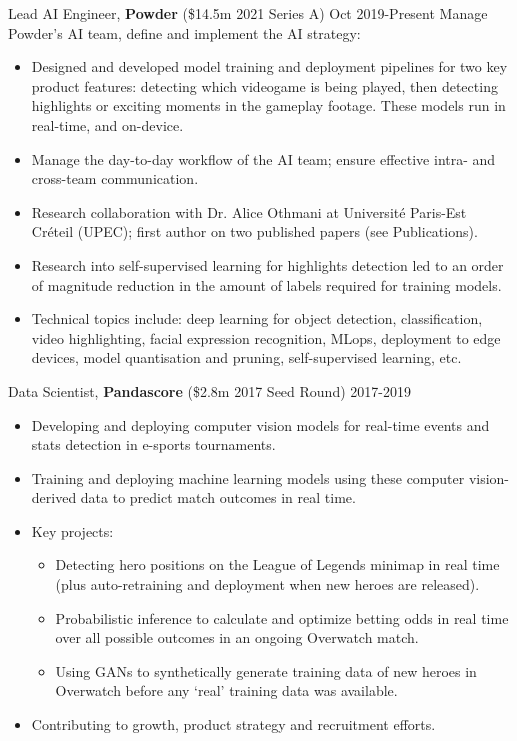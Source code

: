 \documentclass[margin]{res}
\begin{document}
\begin{resume}
		{Lead AI Engineer,} {\bf Powder} (\$14.5m 2021 Series A) \hfill Oct 2019-Present\vspace{2mm}\newline
		Manage Powder's AI team, define and implement the AI strategy:
		\vspace{1mm}
		\begin{itemize}
			\item Designed and developed model training and deployment pipelines for two key product features: detecting which videogame is being played, then detecting highlights or exciting moments in the gameplay footage. These models run in real-time, and on-device.
			\item Manage the day-to-day workflow of the AI team; ensure effective intra- and cross-team communication.
			\item Research collaboration with Dr.  Alice Othmani at Universit\'e Paris-Est Cr\'eteil (UPEC); first author on two published papers (see Publications).
			\item Research into self-supervised learning for highlights detection led to an order of magnitude reduction in the amount of labels required for training models.
			\item Technical topics include: deep learning for object detection, classification, video highlighting, facial expression recognition, MLops, deployment to edge devices, model quantisation and pruning, self-supervised learning, etc.
		\end{itemize}
		
		{Data Scientist,} {\bf Pandascore} (\$2.8m 2017 Seed Round) \hfill 2017-2019
		\vspace{1mm}
		\begin{itemize}
			\item Developing and deploying computer vision models for real-time events and stats detection in e-sports tournaments.
			\item Training and deploying machine learning models using these computer vision-derived data to predict match outcomes in real time.
			\item Key projects:
			\begin{itemize}
				\item Detecting hero positions on the League of Legends minimap in real time (plus auto-retraining and deployment when new heroes are released).
				\item Probabilistic inference to calculate and optimize betting odds in real time over all possible outcomes in an ongoing Overwatch match.
				\item Using GANs to synthetically generate training data of new heroes in Overwatch before any `real' training data was available.
			\end{itemize}
			\item Contributing to growth, product strategy and recruitment efforts.
		\end{itemize}
		

\end{resume}
\end{document}
